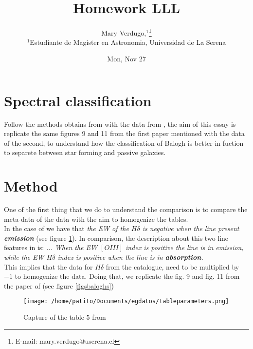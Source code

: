 \documentclass[fleqn,usenatbib]{mnras}
\title[1 homework LLL]{Homework LLL}
\author[Mary Verdugo]{
Mary Verdugo,$^{1}$\thanks{E-mail: mary.verdugo@userena.cl}
\\
$^{1}$Estudiante de Magister en Astronomia, Universidad de La Serena\\
}
\date{Mon, Nov 27}
\begin{document}
\label{firstpage}
\pagerange{\pageref{firstpage}--\pageref{lastpage}}
\maketitle







\section{Spectral classification}

Follow the methods obtains from \citet[]{Balogh} with the data from
\citet[]{Dressler}, the aim of this essay is replicate the same figures
9 and 11 from the first paper mentioned with the data of the second, to understand how 
the classification of Balogh is better in fuction to separete between star forming and passive galaxies.
\\
\section{Method}
One of the first thing that we do to understand the comparison is to compare the meta-data of the data with the aim to homogenize the tables.
\\ 
In the case of \citet{Dressler} we have that \textit{the EW of the $H\delta$  is negative when the line present \textbf{emission}} (see figure \ref{dresslertable}). In comparison, the description about this two line features in \citet{Balogh} is: \textit{... When the EW $[OIII]$ index is positive the line is in emission, while the EW $H\delta$ index is positive when the line is in \textbf{absorption}.}
\\
This implies that the data for $H\delta$ from the \citet{Dressler} catalogue, need to be multiplied by $-1$ to homogenize the data. Doing that, we replicate the fig. 9 and fig. 11 from the paper of \citet{Balogh} (see figure \ref{figsbaloghs})

\begin{figure}
	\texttt{[image: /home/patito/Documents/egdatos/tableparameters.png]}
    \caption{Capture of the table 5 from \citet{Dressler}}
    \label{dresslertable}
\end{figure}
\end{document}
